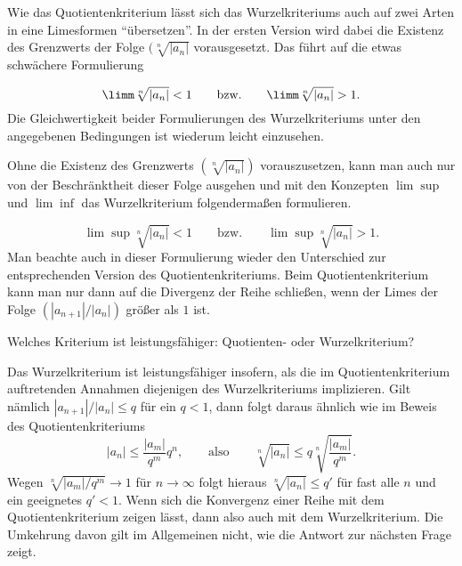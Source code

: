 \begin{antwort}
  \medskip
  Wie das Quotientenkriterium lässt sich das Wurzelkriteriums auch 
  auf zwei Arten in eine Limesformen "`übersetzen"'. 
  In der ersten Version wird dabei die Existenz des 
  Grenzwerts der Folge $(\sqrt[n]{|a_n|}$ vorausgesetzt. 
  Das führt auf die etwas schwächere Formulierung 

  \medskip\noindent
  \[
  \limm \sqrt[n]{|a_n|} < 1 \qquad\text{bzw.} \qquad \limm\sqrt[n]{|a_n|} >1.
  \]
  Die Gleichwertigkeit beider Formulierungen des Wurzelkriteriums unter den 
  angegebenen Bedingungen ist wiederum leicht einzusehen. 

  Ohne die Existenz des Grenzwerts $(\sqrt[n]{|a_n|})$ vorauszusetzen, kann man 
  auch nur von der Beschränktheit dieser Folge ausgehen und mit den Konzepten 
  $\lim\sup$ und $\lim\inf$ das Wurzelkriterium folgendermaßen formulieren.

  \medskip\noindent
  \[
  \lim \sup \sqrt[n]{|a_n|} < 1 \qquad\text{bzw.} 
  \qquad \lim\sup \sqrt[n]{|a_n|} >1.
  \]
  Man beachte auch in dieser Formulierung wieder  
  den Unterschied zur entsprechenden Version des Quotientenkriteriums. 
  Beim Quotientenkriterium kann man nur dann auf die Divergenz der Reihe 
  schließen, wenn der Limes  der Folge $(|a_{n+1}|/|a_n|)$ 
  größer als $1$ ist.   
  \AntEnd
\end{antwort} 

\begin{frage}\label{02_wurza}
  Welches Kriterium ist leistungsfähiger: Quotienten- oder Wurzelkriterium?
\end{frage}

\begin{antwort}
  Das Wurzelkriterium ist leistungsfähiger insofern, als 
  die im Quotientenkriterium auftretenden Annahmen diejenigen 
  des Wurzelkriteriums implizieren. Gilt nämlich $|a_{n+1}|/|a_n| \le q$ 
  für ein $q<1$, dann folgt daraus ähnlich wie im Beweis des 
  Quotientenkriteriums  
  \[
  |a_n| \le \frac{|a_m|}{q^m} q^n, \qquad\text{also}\qquad 
  \sqrt[n]{|a_n|} \le q \sqrt[n]{ \frac{|a_m|}{q^m} }.
  \]
  Wegen $\sqrt[n]{ |a_m| / q^m } \to 1$ für $n\to\infty$ folgt hieraus 
  $\sqrt[n]{|a_n|} \le q'$ für fast alle $n$ und ein geeignetes $q'<1$. 
  Wenn sich die Konvergenz einer Reihe mit dem 
  Quotientenkriterium zeigen lässt, dann also auch mit dem Wurzelkriterium. 
  Die Umkehrung davon gilt im Allgemeinen nicht, wie die Antwort zur 
  nächsten Frage zeigt. 
  \AntEnd
\end{antwort}


